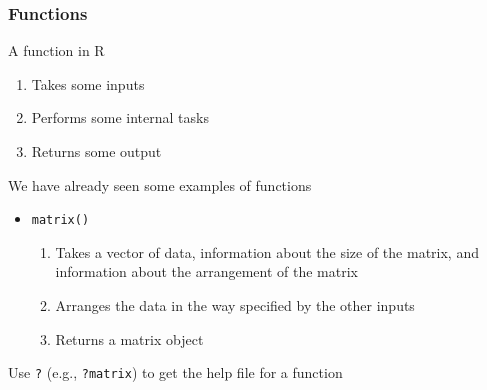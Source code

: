 \documentclass{beamer}\usepackage[]{graphicx}\usepackage[]{color}
\begin{document}
\begin{frame}\frametitle{Functions}
    A function in R
    \begin{enumerate}
        \item Takes some inputs
        \item Performs some internal tasks
        \item Returns some output
    \end{enumerate}
    \vspace{2ex}
    We have already seen some examples of functions
    \begin{itemize}
        \item \texttt{matrix()}
        \begin{enumerate}
            \item Takes a vector of data, information about the size of the matrix, and information about the arrangement of the matrix
            \item Arranges the data in the way specified by the other inputs
            \item Returns a matrix object
        \end{enumerate}
    \end{itemize}
    \vspace{2ex}
    Use \texttt{?} (e.g., \texttt{?matrix}) to get the help file for a function
\end{frame}
\end{document}
